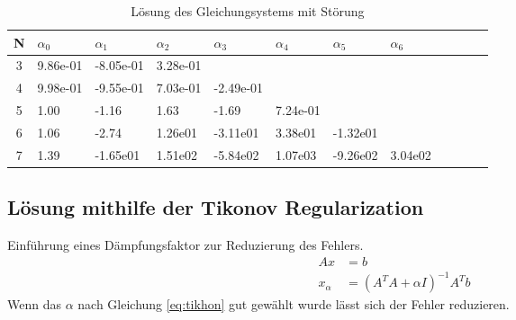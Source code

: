 \documentclass{beamer}
\begin{document}
  \begin{frame}
    \centering    
    \begin{table}[htbp]
    \tiny   
    \renewcommand{\arraystretch}{1.5}
    \begin{tabularx}{\textwidth}{|c|X|X|X|X|X|X|X|X|X|X|X|}
        \hline    
        N & $\alpha_0$&$\alpha_1$&$\alpha_2$&$\alpha_3$&$\alpha_4$&$\alpha_5$&$\alpha_6$ \\\hline
        3 & 9.86e-01 & -8.05e-01 & 3.28e-01 &&&&\\\hline
        4 & 9.98e-01 & -9.55e-01 & 7.03e-01 & -2.49e-01 &&&\\\hline
        5 & 1.00 & -1.16 & 1.63 & -1.69 & 7.24e-01 &&\\\hline
        6 & 1.06 & -2.74 & 1.26e01 & -3.11e01 & 3.38e01 & -1.32e01 &\\\hline
        7 & 1.39 & -1.65e01 & 1.51e02 & -5.84e02 & 1.07e03 & -9.26e02 & 3.04e02 \\\hline
      
        \end{tabularx}
    \caption{Lösung des Gleichungsystems mit Störung}      
    \end{table}
  \end{frame}
  
  \subsection{Lösung mithilfe der Tikonov Regularization}
  \begin{frame}
    Einführung eines Dämpfungsfaktor zur Reduzierung des Fehlers.
    \begin{align}
      Ax& = b\\
      \label{eq:tikhon}
      x_\alpha &= \left(A^T A+\alpha I\right)^{-1}A^T b
    \end{align}
    Wenn das $\alpha$ nach Gleichung \ref{eq:tikhon} gut gewählt wurde lässt sich
    der Fehler reduzieren.
    \end{frame}
    
\end{document}
